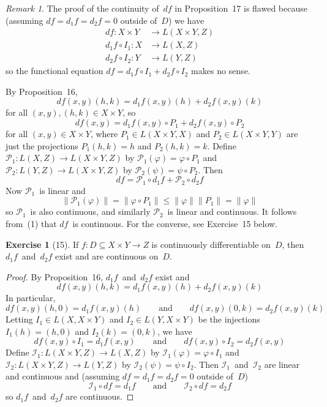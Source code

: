 \documentclass[letterpaper,12pt]{article}
\renewcommand{\P}{\mathcal{P}}
\newcommand{\I}{\mathcal{I}}
\newcommand{\after}{\circ}
\newcommand{\df}{d\!f}
\newcommand{\norm}[1]{\lVert{#1}\rVert}
\theoremstyle{plain}
\theoremstyle{definition}
\newtheorem*{exer}{Exercise}
\theoremstyle{remark}
\newtheorem*{rmk}{Remark}
\begin{document}
\begin{rmk}
The proof of the continuity of~\(\df\) in Proposition~17 is flawed because (assuming \(\df=d_1f=d_2f=0\) outside of~\(D\)) we have
\begin{align*}
\df:X\times Y&\to L(X\times Y,Z)\\
d_1f\after I_1:X&\to L(X,Z)\\
d_2f\after I_2:Y&\to L(Y,Z)
\end{align*}
so the functional equation \(\df=d_1f\after I_1+d_2f\after I_2\) makes no sense.

By Proposition~16,
\[\df(x,y)(h,k)=d_1f(x,y)(h)+d_2f(x,y)(k)\]
for all \((x,y),(h,k)\in X\times Y\), so
\[\df(x,y)=d_1f(x,y)\after P_1+d_2f(x,y)\after P_2\]
for all \((x,y)\in X\times Y\), where \(P_1\in L(X\times Y,X)\) and \(P_2\in L(X\times Y,Y)\) are just the projections \(P_1(h,k)=h\) and \(P_2(h,k)=k\). Define \(\P_1:L(X,Z)\to L(X\times Y,Z)\) by \(\P_1(\varphi)=\varphi\after P_1\) and \(\P_2:L(Y,Z)\to L(X\times Y,Z)\) by \(\P_2(\psi)=\psi\after P_2\). Then
\[\df=\P_1\after d_1f+\P_2\after d_2f\tag{1}\]
Now \(\P_1\)~is linear and
\[\norm{\P_1(\varphi)}=\norm{\varphi\after P_1}\le\norm{\varphi}\norm{P_1}=\norm{\varphi}\]
so \(\P_1\)~is also continuous, and similarly \(\P_2\)~is linear and continuous. It follows from~(1) that \(\df\)~is continuous. For the converse, see Exercise~15 below.
\end{rmk}

\begin{exer}[15]
If \(f:D\subseteq X\times Y\to Z\) is continuously differentiable on~\(D\), then \(d_1f\)~and~\(d_2f\) exist and are continuous on~\(D\).
\end{exer}
\begin{proof}
By Proposition~16, \(d_1f\)~and~\(d_2f\) exist and
\[\df(x,y)(h,k)=d_1f(x,y)(h)+d_2f(x,y)(k)\]
In particular,
\[\df(x,y)(h,0)=d_1f(x,y)(h)\qquad\text{and}\qquad\df(x,y)(0,k)=d_2f(x,y)(k)\]
Letting \(I_1\in L(X,X\times Y)\) and \(I_2\in L(Y,X\times Y)\) be the injections \(I_1(h)=(h,0)\) and \(I_2(k)=(0,k)\), we have
\[\df(x,y)\after I_1=d_1f(x,y)\qquad\text{and}\qquad\df(x,y)\after I_2=d_2f(x,y)\]
Define \(\I_1:L(X\times Y,Z)\to L(X,Z)\) by \(\I_1(\varphi)=\varphi\after I_1\) and \(\I_2:L(X\times Y,Z)\to L(Y,Z)\) by \(\I_2(\psi)=\psi\after I_2\). Then \(\I_1\)~and~\(\I_2\) are linear and continuous and (assuming \(\df=d_1f=d_2f=0\) outside of~\(D\))
\[\I_1\after\df=d_1f\qquad\text{and}\qquad\I_2\after\df=d_2f\]
so \(d_1f\)~and~\(d_2f\) are continuous.
\end{proof}
\end{document}
